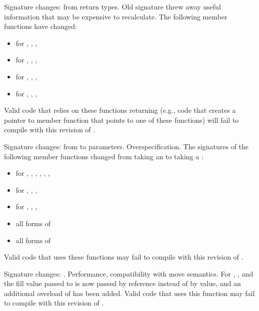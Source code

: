 \change
Signature changes: from  return types.
\rationale
Old signature threw away useful information that may be expensive
to recalculate.
\effect
The following member functions have changed:
\begin{itemize}
\item {} for , , , 
\item {} for , , , 
\item {} for , , , 
\item {} for , , , 
\end{itemize}

Valid \CppIII{} code that relies on these functions returning 
(e.g., code that creates a pointer to member function that points to one
of these functions) will fail to compile with this revision of \Cpp{}.

\change
Signature changes: from  to 
parameters.
\rationale
Overspecification.
\effect
The signatures of the following member functions changed from taking an
 to taking a :

\begin{itemize}
\item {} for , , ,
, , , 
\item {} for , , ,
\item {} for , , , 
\item all forms of 
\item all forms of 
\end{itemize}

Valid \CppIII{} code that uses these functions may fail to compile with this
revision of \Cpp{}.

\change
Signature changes: .
\rationale
Performance, compatibility with move semantics.
\effect
For , , and 
the fill value passed to  is now passed by reference instead of
by value, and an additional overload of  has been added. Valid
\CppIII{} code that uses this function may fail to compile with this revision of \Cpp{}.

